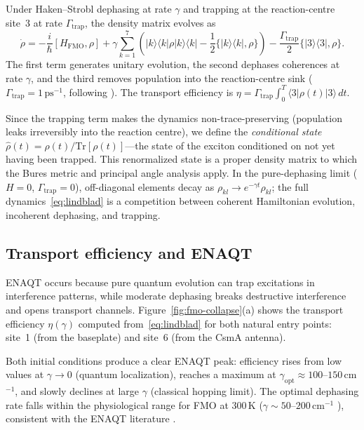 \documentclass[12pt,a4paper]{article}
\theoremstyle{definition}
\theoremstyle{remark}
\begin{document}
Under Haken--Strobl dephasing \cite{haken1973exactly} at rate $\gamma$ and trapping at the reaction-centre site~3 at rate $\Gamma_{\mathrm{trap}}$, the density matrix evolves as
\begin{equation}
\label{eq:lindblad}
\dot{\rho} = -\frac{i}{\hbar}[H_{\mathrm{FMO}}, \rho] + \gamma \sum_{k=1}^7 \left(|k\rangle\langle k| \rho |k\rangle\langle k| - \frac{1}{2}\{|k\rangle\langle k|, \rho\}\right) - \frac{\Gamma_{\mathrm{trap}}}{2}\{|3\rangle\langle 3|, \rho\}.
\end{equation}
The first term generates unitary evolution, the second dephases coherences at rate $\gamma$, and the third removes population into the reaction-centre sink ($\Gamma_{\mathrm{trap}} = 1\,\mathrm{ps}^{-1}$, following \cite{rebentrost2009environment}). The transport efficiency is $\eta = \Gamma_{\mathrm{trap}} \int_0^T \langle 3|\rho(t)|3\rangle\,dt$.

Since the trapping term makes the dynamics non-trace-preserving (population leaks irreversibly into the reaction centre), we define the \emph{conditional state} $\hat{\rho}(t) = \rho(t)/\mathrm{Tr}[\rho(t)]$---the state of the exciton conditioned on not yet having been trapped. This renormalized state is a proper density matrix to which the Bures metric and principal angle analysis apply. In the pure-dephasing limit ($H = 0$, $\Gamma_{\mathrm{trap}} = 0$), off-diagonal elements decay as $\rho_{kl} \to e^{-\gamma t}\rho_{kl}$; the full dynamics~\eqref{eq:lindblad} is a competition between coherent Hamiltonian evolution, incoherent dephasing, and trapping.

\subsection{Transport efficiency and ENAQT}
\label{sec:fmo-enaqt}

ENAQT \cite{rebentrost2009environment,plenio2008dephasing} occurs because pure quantum evolution can trap excitations in interference patterns, while moderate dephasing breaks destructive interference and opens transport channels. Figure~\ref{fig:fmo-collapse}(a) shows the transport efficiency $\eta(\gamma)$ computed from~\eqref{eq:lindblad} for both natural entry points: site~1 (from the baseplate) and site~6 (from the CsmA antenna).

Both initial conditions produce a clear ENAQT peak: efficiency rises from low values at $\gamma \to 0$ (quantum localization), reaches a maximum at $\gamma_{\mathrm{opt}} \approx 100$--$150$\,cm$^{-1}$, and slowly declines at large $\gamma$ (classical hopping limit). The optimal dephasing rate falls within the physiological range for FMO at 300\,K ($\gamma \sim 50$--$200$\,cm$^{-1}$ \cite{cao2020quantum}), consistent with the ENAQT literature \cite{rebentrost2009environment}.
\end{document}
